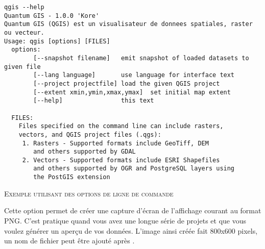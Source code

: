 \small
\begin{verbatim}
qgis --help
Quantum GIS - 1.0.0 'Kore'
Quantum GIS (QGIS) est un visualisateur de donnees spatiales, raster ou vecteur.
Usage: qgis [options] [FILES]
  options:
        [--snapshot filename]   emit snapshot of loaded datasets to given file
        [--lang language]       use language for interface text
        [--project projectfile] load the given QGIS project
        [--extent xmin,ymin,xmax,ymax]  set initial map extent
        [--help]                this text

  FILES:
    Files specified on the command line can include rasters,
    vectors, and QGIS project files (.qgs):
     1. Rasters - Supported formats include GeoTiff, DEM
        and others supported by GDAL
     2. Vectors - Supported formats include ESRI Shapefiles
        and others supported by OGR and PostgreSQL layers using
        the PostGIS extension
\end{verbatim}
\normalsize


\begin{Tip} \caption{\textsc{Exemple utilisant des options de ligne de commande}}
\end{Tip}

%

Cette option permet de cr\'eer une capture d'\'ecran de l'affichage courant au format PNG. C'est pratique quand vous avez une longue s\'erie de projets et que vous voulez g\'en\'erer un aper\c{c}u de vos donn\'ees. L'image ainsi cr\'e\'ee fait 800x600 pixels, un nom de fichier peut \^etre ajout\'e apr\`es .

